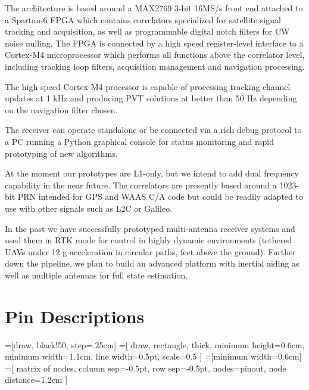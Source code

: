 \documentclass{article}
\begin{document}
\begin{multicols*}{2}
The architecture is based around a MAX2769 3-bit 16MS/s front end
attached to a Spartan-6 FPGA which contains correlators specialized
for satellite signal tracking and acquisition, as well as programmable
digital notch filters for CW noise nulling.  The FPGA is connected by
a high speed register-level interface to a Cortex-M4 microprocessor
which performs all functions above the correlator level, including
tracking loop filters, acquisition management and navigation
processing.

The high speed Cortex-M4 processor is capable of processing tracking
channel updates at 1 kHz and producing PVT solutions at better than 50
Hz depending on the navigation filter chosen.

The receiver can operate standalone or be connected via a rich debug
protocol to a PC running a Python graphical console for status
monitoring and rapid prototyping of new algorithms.

At the moment our prototypes are L1-only, but we intend to add dual
frequency capability in the near future.  The correlators are
presently based around a 1023-bit PRN intended for GPS and WAAS C/A
code but could be readily adapted to use with other signals such as
L2C or Galileo.

In the past we have successfully prototyped multi-antenna receiver systems and
used them in RTK mode for control in highly dynamic environments (tethered
UAVs under 12 g acceleration in circular paths, feet above the ground).
Further down the pipeline, we plan to build an advanced platform with
inertial aiding as well as multiple antennas for full state
estimation.

\end{multicols*}

\section*{Pin Descriptions}
\usetikzlibrary{backgrounds,matrix}
=[draw, black!50, step=.25cm]
=[
  draw, rectangle, thick,
  minimum height=0.6cm,
  minimum width=1.1cm,
  line width=0.5pt,
  scale=0.5
]
=[minimum width=0.6cm]
=[
  matrix of nodes, 
  column sep=-0.5pt,
  row sep=-0.5pt,
  nodes={pinout},
  node distance=1.2cm
]
\end{document}
